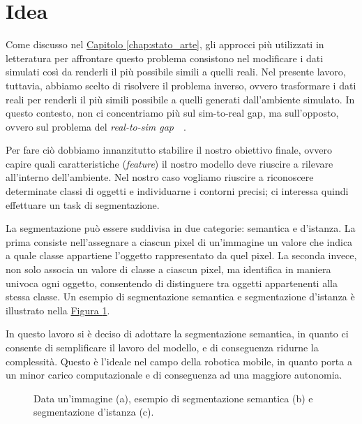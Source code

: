 \documentclass[12pt]{report}
\begin{document}
\section{Idea}
\label{chap:idea}

Come discusso nel \hyperref[chap:stato_arte]{Capitolo \ref{chap:stato_arte}}, gli approcci più utilizzati in letteratura per affrontare questo problema consistono nel modificare i dati simulati così da renderli il più possibile simili a quelli reali. Nel presente lavoro, tuttavia, abbiamo scelto di risolvere il problema inverso, ovvero trasformare i dati reali per renderli il più simili possibile a quelli generati dall'ambiente simulato. In questo contesto, non ci concentriamo più sul sim-to-real gap, ma sull'opposto, ovvero sul problema del \textit{real-to-sim gap}~\cite{8620258}~\cite{Prakash_2021_ICCV}.

Per fare ciò dobbiamo innanzitutto stabilire il nostro obiettivo finale, ovvero capire quali caratteristiche (\textit{feature}) il nostro modello deve riuscire a rilevare all'interno dell'ambiente. Nel nostro caso vogliamo riuscire a riconoscere determinate classi di oggetti e individuarne i contorni precisi; ci interessa quindi effettuare un task di segmentazione.

La segmentazione può essere suddivisa in due categorie: semantica e d'istanza. La prima consiste nell'assegnare a ciascun pixel di un'immagine un valore che indica a quale classe appartiene l'oggetto rappresentato da quel pixel. La seconda invece, non solo associa un valore di classe a ciascun pixel, ma identifica in maniera univoca ogni oggetto, consentendo di distinguere tra oggetti appartenenti alla stessa classe. Un esempio di segmentazione semantica e segmentazione d'istanza è illustrato nella \hyperref[fig:segmentazione]{Figura \ref{fig:segmentazione}}.

In questo lavoro si è deciso di adottare la segmentazione semantica, in quanto ci consente di semplificare il lavoro del modello, e di conseguenza ridurne la complessità. Questo è l'ideale nel campo della robotica mobile, in quanto porta a un minor carico computazionale e di conseguenza ad una maggiore autonomia.

\begin{figure}[t]
	\centering
	\hspace{0.01\textwidth}
	\hspace{0.01\textwidth}
	\caption{Data un'immagine (a), esempio di segmentazione semantica (b) e segmentazione d'istanza (c).}
	\label{fig:segmentazione}
\end{figure}
\end{document}
